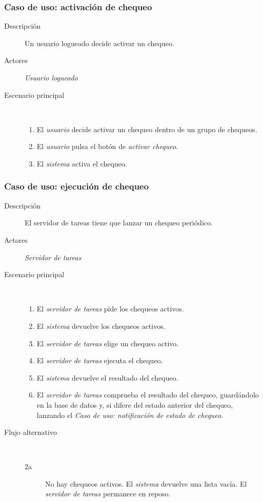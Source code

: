 \subsubsection{Caso de uso: activación de chequeo}

\begin{description}
\item[Descripción] Un usuario logueado decide activar un chequeo.
\item[Actores] \textit{Usuario logueado}
\item[Escenario principal] $\quad$
  \begin{enumerate}
  \item El \textit{usuario} decide activar un chequeo dentro de un grupo de chequeos.
  \item El \textit{usuario} pulsa el botón de \textit{activar chequeo}.
  \item El \textit{sistema} activa el chequeo.
  \end{enumerate}
\end{description}

\subsubsection{Caso de uso: ejecución de chequeo}

\begin{description}
\item[Descripción] El servidor de tareas tiene que lanzar un chequeo periódico.
\item[Actores] \textit{Servidor de tareas}
\item[Escenario principal] $\quad$
  \begin{enumerate}
  \item El \textit{servidor de tareas} pide los chequeos activos.
  \item El \textit{sistema} devuelve los chequeos activos.
  \item El \textit{servidor de tareas} elige un chequeo activo.
  \item El \textit{servidor de tareas} ejecuta el chequeo.
  \item El \textit{sistema} devuelve el resultado del chequeo.
  \item El \textit{servidor de tareas} comprueba el resultado del chequeo,
    guardándolo en la base de datos y, si difere del estado anterior del
    chequeo, lanzando el \textit{Caso de uso: notificación de estado de chequeo}.
  \end{enumerate}
\item[Flujo alternativo] $\quad$
  \begin{description}
  \item[2a] No hay chequeos activos. El \textit{sistema} devuelve una lista
    vacía. El \textit{servidor de tareas} permanece en reposo.
  \end{description}
\end{description}

